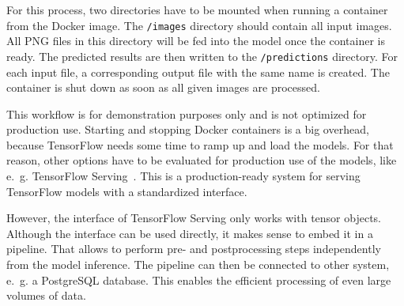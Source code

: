 For this process, two directories have to be mounted when running a container from the Docker image. The \texttt{/images} directory should contain all input images. All PNG files in this directory will be fed into the model once the container is ready. The predicted results are then written to the \texttt{/predictions} directory. For each input file, a corresponding output file with the same name is created. The container is shut down as soon as all given images are processed.

This workflow is for demonstration purposes only and is not optimized for production use. Starting and stopping Docker containers is a big overhead, because TensorFlow needs some time to ramp up and load the models. For that reason, other options have to be evaluated for production use of the models, like e.~g. TensorFlow Serving~\cite{tf_serving20}. This is a production-ready system for serving TensorFlow models with a standardized interface.

However, the interface of TensorFlow Serving only works with tensor objects. Although the interface can be used directly, it makes sense to embed it in a pipeline. That allows to perform pre- and postprocessing steps independently from the model inference. The pipeline can then be connected to other system, e.~g. a PostgreSQL database. This enables the efficient processing of even large volumes of data.

\clearpage
